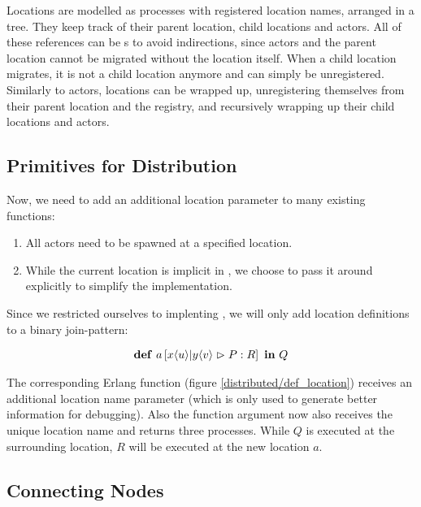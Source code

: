 Locations are modelled as processes with registered location names,
arranged in a tree.
They keep track of their parent location, child locations and actors.
All of these references can be \PID{}s to avoid indirections,
since actors and the parent location cannot be migrated without the location
itself.
When a child location migrates, it is not a child location anymore and can
simply be unregistered.
Similarly to actors, locations can be wrapped up,
unregistering themselves from their parent location and the registry,
and recursively wrapping up their child locations and actors.



\subsection{Primitives for Distribution}

Now, we need to add an additional location parameter to many existing functions:
\begin{enumerate}[nosep]
  \item
    All actors need to be spawned at a specified location.
  \item
    While the current location is implicit in \distjoincalc,
    we choose to pass it around explicitly to simplify the implementation.
\end{enumerate}

Since we restricted ourselves to implenting \corejoincalc,
we will only add location definitions to a binary join-pattern:

\begin{align*}
  \textbf{\textup{def}} \ a \left[ x\langle u\rangle | y\langle v\rangle \vartriangleright P : R \right] \ \textbf{\textup{in}} \ Q
\end{align*}

The corresponding Erlang function (figure \ref{distributed/def_location})
receives an additional location name parameter
(which is only used to generate better information for debugging).
Also the function argument now also receives the unique location name and
returns three processes.
While $Q$ is executed at the surrounding location,
$R$ will be executed at the new location $a$.






\subsection{Connecting Nodes}


